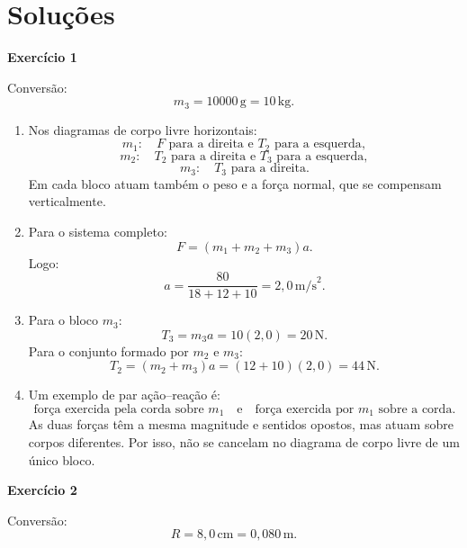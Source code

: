 \documentclass[12pt]{article}
\begin{document}
	\newpage
	
	\section*{Soluções}
	
	\textbf{Exercício 1}
	
	Conversão:
	\[
	m_3=10000\,\text{g}=10\,\text{kg}.
	\]
	
	\begin{enumerate}[label=\textbf{\alph*)}]
		\item Nos diagramas de corpo livre horizontais:
		\[
		m_1:\quad F \text{ para a direita e } T_2 \text{ para a esquerda},
		\]
		\[
		m_2:\quad T_2 \text{ para a direita e } T_3 \text{ para a esquerda},
		\]
		\[
		m_3:\quad T_3 \text{ para a direita}.
		\]
		Em cada bloco atuam também o peso e a força normal, que se compensam verticalmente.
		
		\item Para o sistema completo:
		\[
		F=(m_1+m_2+m_3)a.
		\]
		Logo:
		\[
		a=\frac{80}{18+12+10}
		=2,0\,\text{m/s}^2.
		\]
		
		\item Para o bloco $m_3$:
		\[
		T_3=m_3a=10(2,0)=20\,\text{N}.
		\]
		Para o conjunto formado por $m_2$ e $m_3$:
		\[
		T_2=(m_2+m_3)a=(12+10)(2,0)=44\,\text{N}.
		\]
		
		\item Um exemplo de par ação--reação é:
		\[
		\text{força exercida pela corda sobre }m_1
		\quad\text{e}\quad
		\text{força exercida por }m_1\text{ sobre a corda}.
		\]
		As duas forças têm a mesma magnitude e sentidos opostos, mas atuam sobre corpos
		diferentes. Por isso, não se cancelam no diagrama de corpo livre de um único bloco.
	\end{enumerate}
	
	\vspace{0.2cm}
	
	\textbf{Exercício 2}
	
	Conversão:
	\[
	R=8,0\,\text{cm}=0,080\,\text{m}.
	\]
	
\end{document}
